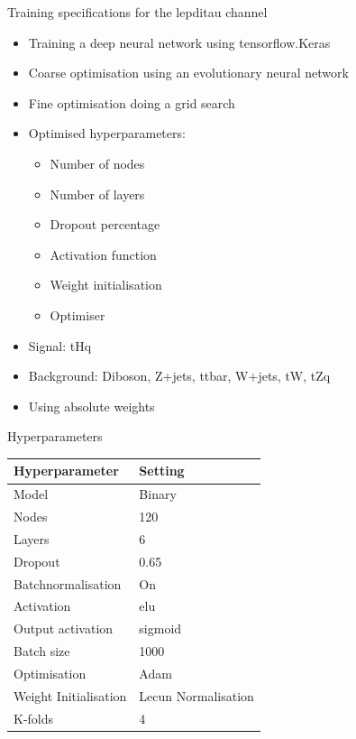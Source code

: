 \begin{frame}{Training specifications for the lepditau channel}
  \begin{itemize}
      \item Training a deep neural network using tensorflow.Keras
      \vspace{0.2cm}
      \item Coarse optimisation using an evolutionary neural network
      \vspace{0.2cm}
      \item Fine optimisation doing a grid search
      \vspace{0.2cm}
      \item Optimised hyperparameters:
          \begin{itemize}
              \item Number of nodes
              \item Number of layers
              \item Dropout percentage
              \item Activation function
              \item Weight initialisation
              \item Optimiser
          \end{itemize}
      \item Signal: tHq
      \item Background: Diboson, Z+jets, ttbar, W+jets, tW, tZq
      \item Using absolute weights
  \end{itemize}
\end{frame}

\begin{frame}{Hyperparameters}
    \begin{table}[]
    \begin{tabular}{|l|l|}
    \hline
    Hyperparameter          &     Setting              \\ \hline
    Model                   &     Binary          \\ \hline
    Nodes                   &     120                  \\ \hline
    Layers                  &     6                    \\ \hline
    Dropout                 &     0.65                 \\ \hline
    Batchnormalisation      &     On                   \\ \hline
    Activation              &     elu                  \\ \hline
    Output activation       &     sigmoid              \\ \hline
    Batch size              &     1000                 \\ \hline
    Optimisation            &     Adam                 \\ \hline
    Weight Initialisation   &     Lecun Normalisation  \\ \hline
    K-folds                 &     4                    \\ \hline
    \end{tabular}
    \end{table}
\end{frame}

